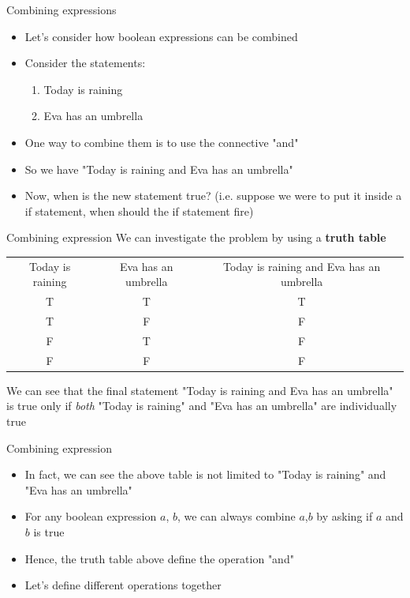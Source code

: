 \documentclass[10pt,xcolor={table,dvipsnames},t]{beamer}
\begin{document}
\begin{frame}{Combining expressions}
  \begin{itemize}
    \item Let's consider how boolean expressions can be combined
    \item Consider the statements:
    \begin{enumerate}
      \item Today is raining
      \item Eva has an umbrella
    \end{enumerate}
    \item One way to combine them is to use the connective "and"
    \item So we have "Today is raining and Eva has an umbrella"
    \item Now, when is the new statement true? (i.e. suppose we were to put it inside a if statement, when should the if statement fire)
  \end{itemize}
\end{frame}

\begin{frame}{Combining expression}
  We can investigate the problem by using a \textbf{truth table}
  \begin{table}[]
    \begin{tabular}{ccc}
    Today is raining & Eva has an umbrella & Today is raining and Eva has an umbrella \\
    T                & T                   & T                                        \\
    T                & F                   & F                                        \\
    F                & T                   & F                                        \\
    F                & F                   & F                                       
    \end{tabular}
    \end{table}
    We can see that the final statement "Today is raining and Eva has an umbrella" is true only if \textit{both} "Today is raining" and "Eva has an umbrella" are individually true
\end{frame}

\begin{frame}{Combining expression}
  \begin{itemize}
    \item In fact, we can see the above table is not limited to "Today is raining" and "Eva has an umbrella"
    \item For any boolean expression $a$, $b$, we can always combine $a$,$b$ by asking if $a$ and $b$ is true
    \item Hence, the truth table above define the operation "and"
    \item Let's define different operations together
  \end{itemize}
\end{frame}
\end{document}
